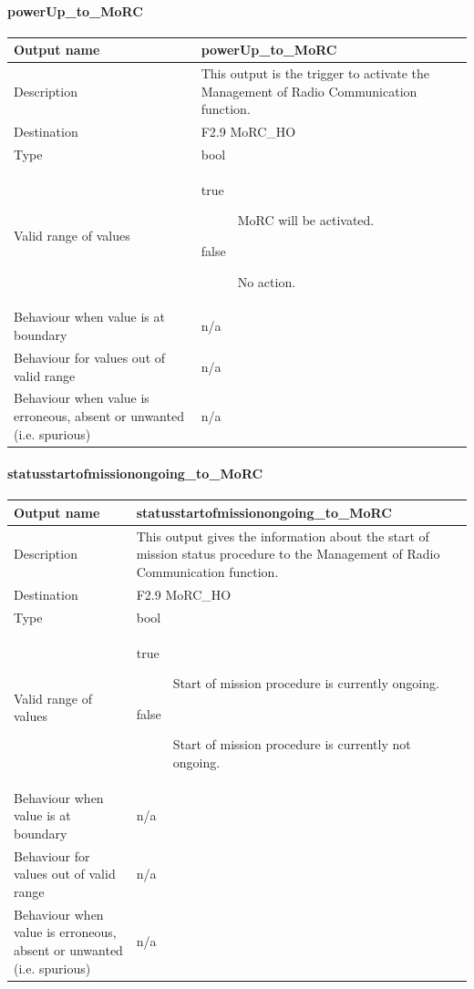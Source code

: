 \paragraph{powerUp\_to\_MoRC}

\begin{longtable}{p{}p{}}
\toprule
Output name				& powerUp\_to\_MoRC \\
\midrule
Description				& This output is the trigger to activate the Management of Radio Communication function. \\
\midrule
Destination				& F2.9 MoRC\_HO \\ 
\midrule
Type					& bool \\
\midrule
Valid range of values	& \begin{description}
\item[true]MoRC will be activated. 
\item[false]No action.
\end{description} \\
\midrule
Behaviour when value is at boundary	& n/a \\
\midrule
Behaviour for values out of valid range	& n/a \\
\midrule
Behaviour when value is erroneous, absent or unwanted (i.e. spurious) & n/a \\
\bottomrule
\end{longtable}

\paragraph{statusstartofmissionongoing\_to\_MoRC}

\begin{longtable}{p{}p{}}
\toprule
Output name				& statusstartofmissionongoing\_to\_MoRC \\
\midrule
Description				& This output gives the information about the start of mission status procedure to the Management of Radio Communication function. \\
\midrule
Destination				& F2.9 MoRC\_HO \\ 
\midrule
Type					& bool \\
\midrule
Valid range of values	& \begin{description}
\item[true]Start of mission procedure is currently ongoing.
\item[false]Start of mission procedure is currently not ongoing.
\end{description} \\
\midrule
Behaviour when value is at boundary	& n/a \\
\midrule
Behaviour for values out of valid range	& n/a \\
\midrule
Behaviour when value is erroneous, absent or unwanted (i.e. spurious) & n/a \\
\bottomrule
\end{longtable}

